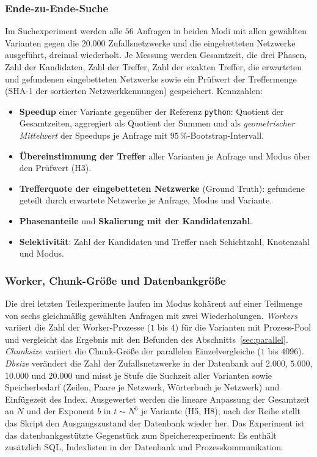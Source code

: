 \subsubsection{Ende-zu-Ende-Suche}
\label{sec:ucx_search}

Im Suchexperiment werden alle $56$ Anfragen in beiden Modi mit allen gewählten Varianten gegen die $20.000$ Zufallsnetzwerke und die eingebetteten Netzwerke ausgeführt, dreimal wiederholt. Je Messung werden Gesamtzeit, die drei Phasen, Zahl der Kandidaten, Zahl der Treffer, Zahl der exakten Treffer, die erwarteten und gefundenen eingebetteten Netzwerke sowie ein Prüfwert der Treffermenge (SHA-1 der sortierten Netzwerkkennungen) gespeichert. Kennzahlen:
\begin{itemize}
	\item \textbf{Speedup} einer Variante gegenüber der Referenz \texttt{python}: Quotient der Gesamtzeiten, aggregiert als Quotient der Summen und als \emph{geometrischer Mittelwert} der Speedups je Anfrage mit $95\,\%$-Bootstrap-Intervall.
	\item \textbf{Übereinstimmung der Treffer} aller Varianten je Anfrage und Modus über den Prüfwert (H3).
	\item \textbf{Trefferquote der eingebetteten Netzwerke} (Ground Truth): gefundene geteilt durch erwartete Netzwerke je Anfrage, Modus und Variante.
	\item \textbf{Phasenanteile} und \textbf{Skalierung mit der Kandidatenzahl}.
	\item \textbf{Selektivität}: Zahl der Kandidaten und Treffer nach Schichtzahl, Knotenzahl und Modus.
\end{itemize}

\subsubsection{Worker, Chunk-Größe und Datenbankgröße}
\label{sec:ucx_skalierung}

Die drei letzten Teilexperimente laufen im Modus kohärent auf einer Teilmenge von sechs gleichmäßig gewählten Anfragen mit zwei Wiederholungen. \emph{Workers} variiert die Zahl der Worker-Prozesse ($1$ bis $4$) für die Varianten mit Prozess-Pool und vergleicht das Ergebnis mit den Befunden des Abschnitts~\ref{sec:parallel}. \emph{Chunksize} variiert die Chunk-Größe der parallelen Einzelvergleiche ($1$ bis $4096$). \emph{Dbsize} verändert die Zahl der Zufallsnetzwerke in der Datenbank auf $2.000$, $5.000$, $10.000$ und $20.000$ und misst je Stufe die Suchzeit aller Varianten sowie Speicherbedarf (Zeilen, Paare je Netzwerk, Wörterbuch je Netzwerk) und Einfügezeit des Index. Ausgewertet werden die lineare Anpassung der Gesamtzeit an $N$ und der Exponent $b$ in $t\sim N^b$ je Variante (H5, H8); nach der Reihe stellt das Skript den Ausgangszustand der Datenbank wieder her. Das Experiment ist das datenbankgestützte Gegenstück zum Speicherexperiment: Es enthält zusätzlich SQL, Indexlisten in der Datenbank und Prozesskommunikation.

